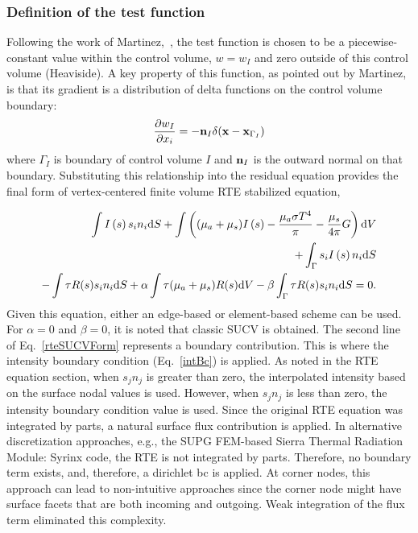 \subsubsection{Definition of the test function}
Following the work of Martinez,~\cite{Martinez:2005}, the test function is chosen to be a 
piecewise-constant value within the control volume, $w = w_I$ and zero outside of this control volume (Heaviside).
A key property of this function, as pointed out by Martinez, is that its
gradient is a distribution of delta functions on the control volume
boundary:
\begin{equation}
\frac{\partial w_I}{\partial x_i} = - {\bf n}_I \delta({\bf x} - {\bf x}_{\Gamma_I})
\label{eqn:GradPiecewiseConstant}
\end{equation}
where $\Gamma_I$ is boundary of control volume $I$ and ${\bf n}_I$
is the outward normal on that boundary.  Substituting this relationship into the residual equation provides
the final form of vertex-centered finite volume RTE stabilized equation,

\begin{eqnarray}
   \int I\left(s\right) s_i n_i {\rm d}S + \int \left( (\mu_a + \mu_s ) I\left(s\right) 
   - {{\mu_a \sigma T^4} \over {\pi}} -\frac{\mu_s}{4\pi}G \right) {\rm d}V  \nonumber \\
+ \int_\Gamma s_i I\left(s\right) n_i {\rm d}S \nonumber \\
 - \int \tau R(s) s_i n_i {\rm d}S +\alpha \int \tau (\mu_a +\mu_s) R(s) {\rm d}V -\beta \int_\Gamma \tau R(s) s_i n_i {\rm d}S= 0.
\label{rteSUCVForm}
\end{eqnarray}
Given this equation, either an edge-based or element-based scheme can be used. For $\alpha = 0$ and $\beta = 0$, it 
is noted that classic SUCV is obtained. The second line of Eq.~\ref{rteSUCVForm} represents a boundary contribution. 
This is where the intensity boundary condition (Eq.~\ref{intBc}) is applied. As noted in the RTE equation section, 
when $s_j n_j$ is greater than zero, the interpolated intensity based on
the surface nodal values is used. However, when $s_j n_j$ is less than zero, the intensity boundary condition 
value is used. Since the original RTE equation was integrated 
by parts, a natural surface flux contribution is applied. In alternative discretization approaches, e.g., the
SUPG FEM-based Sierra Thermal Radiation Module: Syrinx code, the RTE is not integrated by parts. Therefore, 
no boundary term exists, and, therefore, a dirichlet bc is applied. At corner nodes, this approach can lead 
to non-intuitive approaches since the corner node might have surface facets that are both incoming and outgoing. 
Weak integration of the flux term eliminated this complexity.

